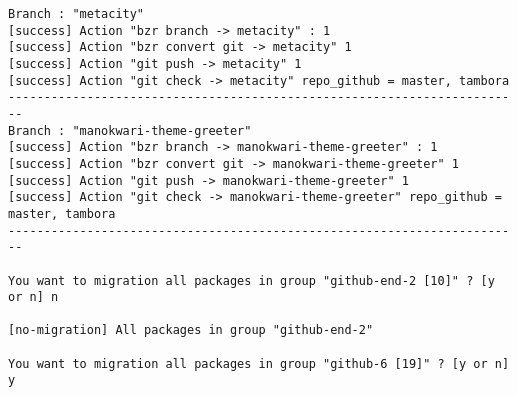 {\begin{lstlisting}[language=ShellBash2]
Branch : "metacity"
[success] Action "bzr branch -> metacity" : 1
[success] Action "bzr convert git -> metacity" 1
[success] Action "git push -> metacity" 1
[success] Action "git check -> metacity" repo_github = master, tambora
------------------------------------------------------------------------
Branch : "manokwari-theme-greeter"
[success] Action "bzr branch -> manokwari-theme-greeter" : 1
[success] Action "bzr convert git -> manokwari-theme-greeter" 1
[success] Action "git push -> manokwari-theme-greeter" 1
[success] Action "git check -> manokwari-theme-greeter" repo_github = master, tambora
------------------------------------------------------------------------

You want to migration all packages in group "github-end-2 [10]" ? [y or n] n

[no-migration] All packages in group "github-end-2" 

You want to migration all packages in group "github-6 [19]" ? [y or n] y


\end{lstlisting}}
